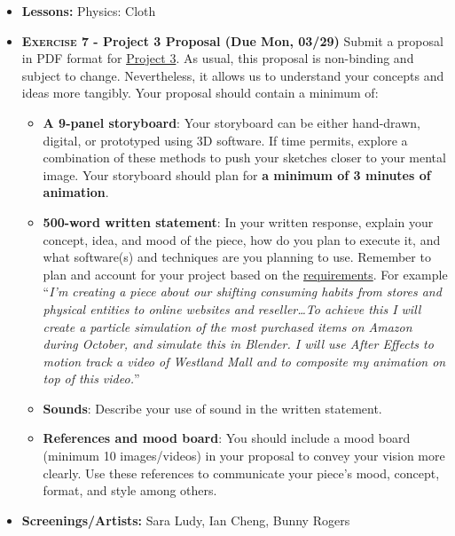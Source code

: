 \def\dMon{Mon, 03/29}
\def\dTues{Tues, 03/30}
\def\dWed{Wed, 03/31}
\def\dThur{Thur, 04/01}
\def\dFri{Fri, 04/02}
\def\dSat{Sat, 04/03}
\def\dSun{Sun, 04/04}
\placeDate

\begin{itemize}[noitemsep,topsep=0pt,leftmargin=*]
    \item \textbf{Lessons:} Physics: Cloth
    \item \textbf{\textsc{Exercise 7} - Project 3 Proposal (Due \dMon)}   Submit a proposal in PDF format for \hyperlink{project3}{Project 3}. As usual, this proposal is non-binding and subject to change. Nevertheless, it allows us to understand your concepts and ideas more tangibly. Your proposal should contain a minimum of:
    \begin{itemize}
        \item \textbf{A 9-panel storyboard}: Your storyboard can be either hand-drawn, digital, or prototyped using 3D software. If time permits, explore a combination of these methods to push your sketches closer to your mental image. Your storyboard should plan for \textbf{a minimum of 3 minutes of animation}.
        \item \textbf{500-word written statement}: In your written response, explain your concept, idea, and mood of the piece, how do you plan to execute it, and what software(s) and techniques are you planning to use. Remember to plan and account for your project based on the \hyperlink{project3}{requirements}. For example ``\emph{I'm creating a piece about our shifting consuming habits from stores and physical entities to online websites and reseller\dots To achieve this I will create a particle simulation of the most purchased items on Amazon during October, and simulate this in Blender. I will use After Effects to motion track a video of Westland Mall and to composite my animation on top of this video.}''
        \item \textbf{Sounds}: Describe your use of sound in the written statement.
        \item \textbf{References and mood board}: You should include a mood board (minimum 10 images/videos) in your proposal to convey your vision more clearly. Use these references to communicate your piece's mood, concept, format, and style among others.
    \end{itemize}
    \item \textbf{Screenings/Artists:} Sara Ludy, Ian Cheng, Bunny Rogers
\end{itemize}